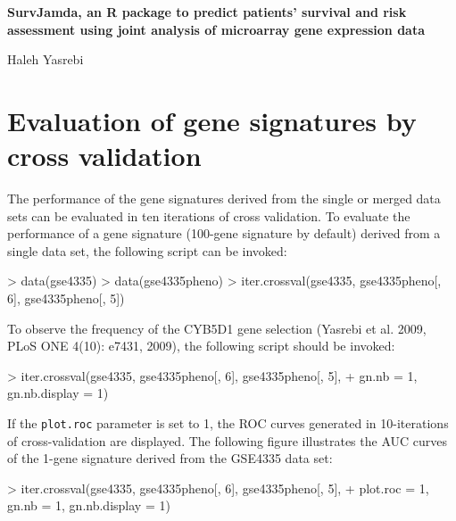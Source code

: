 \documentclass[a4paper]{article}
\begin{document}
\pagestyle {empty}

\begin{center}
 \LARGE
\textbf{SurvJamda, an R package to predict patients' survival and risk assessment using joint analysis of microarray gene expression data}
\large

\vspace{5cm}
Haleh Yasrebi
\end{center}
\newpage
\pagestyle{plain}
\tableofcontents
\newpage
{}
\section{Evaluation of gene signatures by cross validation}
The performance of the gene signatures derived from the single or merged data sets can be evaluated in ten iterations of cross validation. To evaluate the performance of a gene signature (100-gene signature by default) derived from a single data set, the following script can be invoked:

\begin{Schunk}
\begin{Sinput}
> data(gse4335)
> data(gse4335pheno)
> iter.crossval(gse4335, gse4335pheno[, 6], gse4335pheno[, 5])
\end{Sinput}
\end{Schunk}

To observe the frequency of the CYB5D1 gene selection (Yasrebi et al. 2009, PLoS
ONE 4(10): e7431, 2009), the following script should be invoked:

\begin{Schunk}
\begin{Sinput}
> iter.crossval(gse4335, gse4335pheno[, 6], gse4335pheno[, 5], 
+     gn.nb = 1, gn.nb.display = 1)
\end{Sinput}
\end{Schunk}

If the \verb+plot.roc+ parameter is set to 1, the ROC curves generated in 10-iterations of cross-validation are displayed. The following figure illustrates the AUC curves of the 1-gene signature derived from the GSE4335 data set:
\begin{Schunk}
\begin{Sinput}
> iter.crossval(gse4335, gse4335pheno[, 6], gse4335pheno[, 5], 
+     plot.roc = 1, gn.nb = 1, gn.nb.display = 1)
\end{Sinput}
\end{Schunk}
\end{document}
